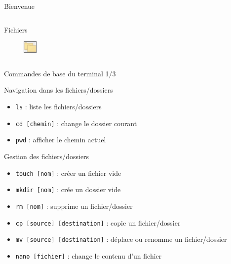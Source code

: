 \documentclass[aspectratio=169,xcolor=dvipsnames]{beamer}
\begin{document}
\begin{frame}{Bienvenue}
\begin{columns}[c]
\begin{center}
            Fichiers
            \begin{figure}
                \includegraphics[width=0.7\textwidth]{images/fichiers.png}
            \end{figure}
        \end{center}

    \end{columns}
\end{frame}


\begin{frame}{Commandes de base du terminal 1/3}

    Navigation dans les fichiers/dossiers
    \begin{itemize}
        \item \texttt{ls} : liste les fichiers/dossiers
        \item \texttt{cd [chemin]} : change le dossier courant
        \item \texttt{pwd} : afficher le chemin actuel
    \end{itemize}

    Gestion des fichiers/dossiers
    \begin{itemize}
        \item \texttt{touch [nom]} : créer un fichier vide
        \item \texttt{mkdir [nom]} : crée un dossier vide
        \item \texttt{rm [nom]} : supprime un fichier/dossier
        \item \texttt{cp [source] [destination]} : copie un fichier/dossier
        \item \texttt{mv [source] [destination]} : déplace ou renomme un fichier/dossier
        \item \texttt{nano [fichier]} : change le contenu d'un fichier
    \end{itemize}

\end{frame}
\end{document}
